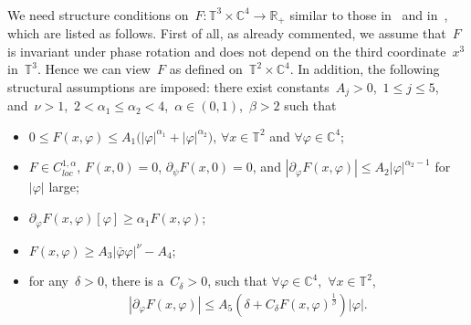 \documentclass[10pt,a4paper]{amsart}
\newcommand{\p}{\partial}
\newcommand{\R}{\mathbb{R}}
\newcommand{\C}{\mathbb{C}}
\newcommand{\T}{\mathbb{T}}
\begin{document}
\ 

We need structure conditions on~$F\colon \T^3\times \C^4\to \R_+$ similar to those in~\cite{WZ2026Stationary} and in~\cite{EstebanSere1995stationary}, which are listed as follows. 
First of all, as already commented, we assume that~$F$ is invariant under phase rotation and does not depend on the third coordinate~$x^3$ in~$\T^3$.
Hence we can view~$F$ as defined on~$\T^2\times\C^4$. 
In addition, the following structural assumptions are imposed: there exist constants~$A_j>0$,~$1\leq j\leq 5$, and~$\nu>1$,~$2<\alpha_1\leq\alpha_2<4$,~$\alpha\in(0,1)$,~$\beta>2$ such that 
\begin{itemize}
    \item[(F1)] $ 0 \leq F(x,\varphi) \leq A_1 \big( |\varphi|^{\alpha_1} + |\varphi|^{\alpha_2} \big)$, $\forall x\in\T^2$ and $\forall \varphi \in \mathbb{C}^4 $;

    \item[(F2)] \( F \in C^{1,\alpha}_{loc} \), $F(x,0) =0 $, $\p_\psi F(x,0)=0$, and
          \( |\p_{\varphi} F(x,\varphi)| \leq A_2 |\varphi|^{\alpha_2 - 1} \) for \( |\varphi| \) large;

    \item[(F3)] \(  \p_\varphi F(x,\varphi)[\varphi]\geq \alpha_1 F(x,\varphi) \); 


    \item[(F4)] \( F(x,\varphi) \geq A_3 |\bar{\varphi}\varphi|^\nu - A_4 \);

    \item[(F5)] for any~$\delta > 0$, there is a~$C_\delta > 0$, such that $\forall \varphi \in \mathbb{C}^4$,~$\forall x\in\mathbb{T}^2$,
        \begin{align}
        |\p_\varphi F(x,\varphi)| 
        \leq A_5 \left( \delta + C_\delta F(x,\varphi)^{\frac{1}{\beta}} \right) |\varphi|.
        \end{align}
\end{itemize}
\end{document}
